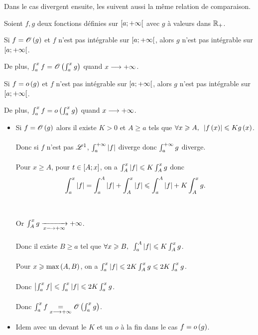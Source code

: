 Dans le cas divergent ensuite, les  suivent aussi la même relation de comparaison.

\begin{theo}
Soient \(f,g\) deux fonctions définies sur \(\left[a;+\infty\right[\) avec \(g\) à valeurs dans \(\mathbb{R}_+\).

Si \(f=\mathscr{O}\left(g\right)\) et \(f\) n'est pas intégrable sur \(\left[a;+\infty\right[\), alors \(g\) n'est pas intégrable sur \(\left[a;+\infty\right[\).

De plus, \(\int_a^xf=\mathscr{O}\left(\int_a^xg\right)\) quand \(x\longrightarrow+\infty\).

Si \(f=o\left(g\right)\) et \(f\) n'est pas intégrable sur \(\left[a;+\infty\right[\), alors \(g\) n'est pas intégrable sur \(\left[a;+\infty\right[\).

De plus, \(\int_a^xf=o\left(\int_a^xg\right)\) quand \(x\longrightarrow+\infty\).
\end{theo}

\begin{dem}
\begin{itemize}
    \item Si \(f=\mathscr{O}\left(g\right)\) alors il existe \(K>0\) et \(A\geq a\) tels que \(\quantifs{\forall x\geq A}\abs{f\paren{x}}\leq Kg\paren{x}\). \\\\ Donc si \(f\) n'est pas \(\integ{1}{}{}\), \(\int_a^{+\infty}\left\lvert f\right\rvert\) diverge donc \(\int_a^{+\infty}g\) diverge. \\\\ Pour \(x\geq A\), pour \(t\in\left[A;x\right]\), on a \(\int_A^x\left\lvert f\right\rvert\leqslant K\int_A^xg\) donc \[\int_a^x\left\lvert f\right\rvert=\int_a^A\left\lvert f\right\rvert+\int_A^x\left\lvert f\right\rvert\leqslant\int_a^A\left\lvert f\right\rvert+K\int_A^xg.\] \\\\ Or \(\int_A^xg\xrightarrow[x\longrightarrow+\infty]{}+\infty\). \\\\ Donc il existe \(B\geq a\) tel que \(\quantifs{\forall x\geq B}\int_a^A\abs{f}\leq K\int_A^xg\). \\\\ Pour \(x\geqslant\max\left(A,B\right)\), on a \(\int_a^x\left\lvert f\right\rvert\leqslant2K\int_A^xg\leqslant2K\int_a^xg\). \\\\ Donc \(\left\lvert\int_a^xf\right\rvert\leqslant\int_a^x\left\lvert f\right\rvert\leqslant2K\int_a^xg\). \\\\ Donc \(\int_a^xf\underset{x\longrightarrow+\infty}{=}\mathscr{O}\left(\int_a^xg\right)\). \\
    \item Idem avec un  devant le \(K\) et un \(o\) à la fin dans le cas \(f=o\left(g\right)\).
\end{itemize}
\end{dem}

